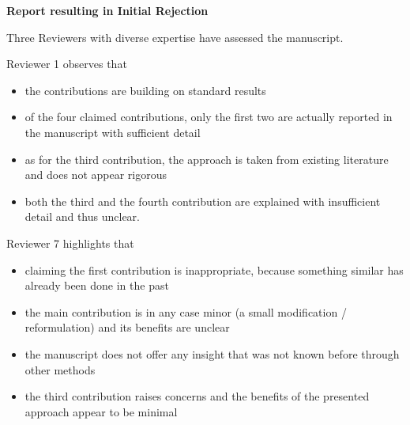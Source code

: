 \thispagestyle{empty}
\setcounter{page}{0}
\begin{center}
    {\LARGE\textbf{Report resulting in Initial Rejection}}
\end{center}
Three Reviewers with diverse expertise have assessed the manuscript.

Reviewer 1 observes that
\vspace{-7pt}
\begin{itemize}[nosep]
    \item {%
        the contributions are building on standard results
    }%
    \item{%
        of the four claimed contributions, only the first two are actually reported in the manuscript with sufficient detail
    }%
    \item{%
        as for the third contribution, the approach is taken from existing literature and does not appear rigorous
    }%
    \item{%
        both the third and the fourth contribution are explained with insufficient detail and thus unclear.
    }%
\end{itemize}

Reviewer 7 highlights that
\vspace{-7pt}
\begin{itemize}[nosep]
    \item {%
        claiming the first contribution is inappropriate, because something similar has already been done in the past
    }%
    \item{%
        the main contribution is in any case minor (a small modification / reformulation) and its benefits are unclear
    }%
    \item{%
        the manuscript does not offer any insight that was not known before through other methods
    }%
    \item{%
        the third contribution raises concerns and the benefits of the presented approach appear to be minimal
    }%
\end{itemize}


